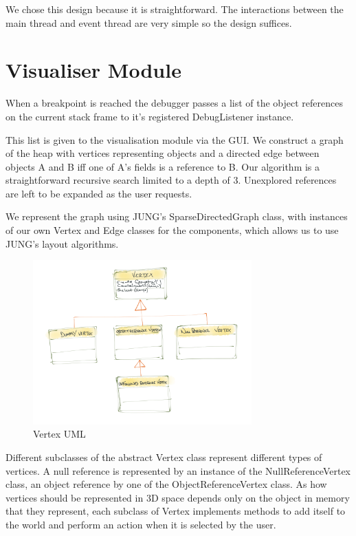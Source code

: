 \documentclass[11pt, a4paper]{report}
\begin{document}
We chose this design because it is straightforward. The interactions between the main thread and event thread are very simple so the design suffices.

\section{Visualiser Module}

When a breakpoint is reached the debugger passes a list of the object references on the current stack frame to it’s registered DebugListener instance.

This list is given to the visualisation module via the GUI. We construct a graph of the heap with vertices representing objects and a directed edge between objects A and B iff one of A’s fields is a reference to B. Our algorithm is a straightforward recursive search limited to a depth of 3. Unexplored references are left to be expanded as the user requests.

We represent the graph using JUNG’s SparseDirectedGraph class, with instances of our own Vertex and Edge classes for the components, which allows us to use JUNG’s layout algorithms.

\begin{figure}[h]
        \centering
        \includegraphics[width=0.75\textwidth]{images/final/vertex.png}
        \caption{Vertex UML}
\end{figure}

Different subclasses of the abstract Vertex class represent different types of vertices. A null reference is represented by an instance of the NullReferenceVertex class, an object reference by one of the ObjectReferenceVertex class. As how vertices should be represented in 3D space depends only on the object in memory that they represent, each subclass of Vertex implements methods to add itself to the world and perform an action when it is selected by the user.
\end{document}
